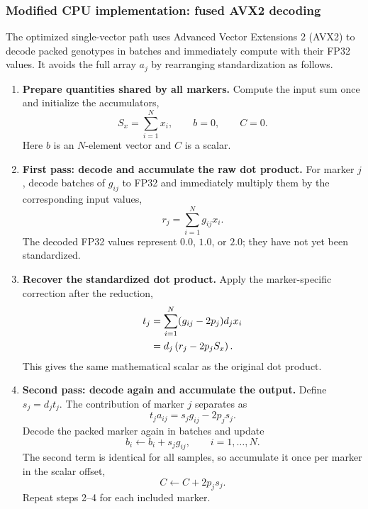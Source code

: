 \documentclass{article}
\begin{document}
\subsubsection{Modified CPU implementation: fused AVX2 decoding}

The optimized single-vector path uses Advanced Vector Extensions 2
(AVX2) to decode packed genotypes in batches and immediately compute
with their FP32 values. It avoids the full array $a_j$ by rearranging
standardization as follows.

\begin{enumerate}
 \item \textbf{Prepare quantities shared by all markers.}
 Compute the input sum once and initialize the accumulators,
 \begin{equation}
  S_x=\sum_{i=1}^{N}x_i,\qquad b=0,\qquad C=0.
 \end{equation}
 Here $b$ is an $N$-element vector and $C$ is a scalar.

 \item \textbf{First pass: decode and accumulate the raw dot product.}
 For marker $j$, decode batches of $g_{ij}$ to FP32 and immediately
 multiply them by the corresponding input values,
 \begin{equation}
  r_j=\sum_{i=1}^{N}g_{ij}x_i.
 \end{equation}
 The decoded FP32 values represent $0.0$, $1.0$, or $2.0$;
 they have not yet been standardized.

 \item \textbf{Recover the standardized dot product.}
 Apply the marker-specific correction after the reduction,
 \begin{align}
  t_j
   &=\sum_{i=1}^{N}(g_{ij}-2p_j)d_jx_i \notag\\
   &=d_j\left(r_j-2p_jS_x\right).
   \label{eq:avx2-dot-correction}
 \end{align}
 This gives the same mathematical scalar as the original dot product.

 \item \textbf{Second pass: decode again and accumulate the output.}
 Define $s_j=d_jt_j$. The contribution of marker $j$ separates as
 \begin{equation}
  t_ja_{ij}=s_jg_{ij}-2p_js_j.
 \end{equation}
 Decode the packed marker again in batches and update
 \begin{equation}
  b_i\leftarrow b_i+s_jg_{ij},\qquad i=1,\ldots,N.
 \end{equation}
 The second term is identical for all samples, so accumulate it once
 per marker in the scalar offset,
 \begin{equation}
  C\leftarrow C+2p_js_j.
 \end{equation}
 Repeat steps 2--4 for each included marker.


\end{enumerate}
\end{document}
